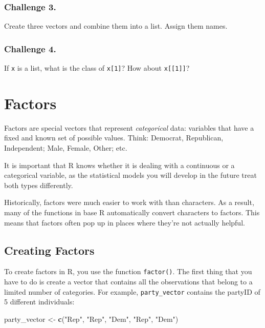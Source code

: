 \documentclass[]{book}
\newenvironment{Shaded}{\begin{snugshade}}{\end{snugshade}}
\newcommand{\KeywordTok}[1]{\textcolor[rgb]{0.13,0.29,0.53}{\textbf{#1}}}
\newcommand{\NormalTok}[1]{#1}
\newcommand{\StringTok}[1]{\textcolor[rgb]{0.31,0.60,0.02}{#1}}
\begin{document}
\hypertarget{challenge-3.-1}{%
\subsubsection*{Challenge 3.}\label{challenge-3.-1}}

Create three vectors and combine them into a list. Assign them names.

\hypertarget{challenge-4.}{%
\subsubsection*{Challenge 4.}\label{challenge-4.}}

If \texttt{x} is a list, what is the class of \texttt{x{[}1{]}}? How about \texttt{x{[}{[}1{]}{]}}?

\hypertarget{factors}{%
\section{Factors}\label{factors}}

Factors are special vectors that represent \emph{categorical} data: variables that have a fixed and known set of possible values. Think: Democrat, Republican, Independent; Male, Female, Other; etc.

It is important that R knows whether it is dealing with a continuous or a categorical variable, as the statistical models you will develop in the future treat both types differently.

Historically, factors were much easier to work with than characters. As a result, many of the functions in base R automatically convert characters to factors. This means that factors often pop up in places where they're not actually helpful.

\hypertarget{creating-factors}{%
\subsection{Creating Factors}\label{creating-factors}}

To create factors in R, you use the function \texttt{factor()}. The first thing that you have to do is create a vector that contains all the observations that belong to a limited number of categories. For example, \texttt{party\_vector} contains the partyID of 5 different individuals:

\begin{Shaded}
\begin{Highlighting}[]
\NormalTok{party_vector <-}\StringTok{ }\KeywordTok{c}\NormalTok{(}\StringTok{"Rep"}\NormalTok{, }\StringTok{"Rep"}\NormalTok{, }\StringTok{"Dem"}\NormalTok{, }\StringTok{"Rep"}\NormalTok{, }\StringTok{"Dem"}\NormalTok{)}
\end{Highlighting}
\end{Shaded}
\end{document}
